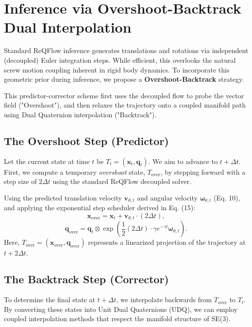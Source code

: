 \documentclass[a4paper,11pt]{article}
\begin{document}
\section{Inference via Overshoot-Backtrack Dual Interpolation}

Standard ReQFlow inference generates translations and rotations via independent (decoupled) Euler integration steps. While efficient, this overlooks the natural screw motion coupling inherent in rigid body dynamics. To incorporate this geometric prior during inference, we propose a \textbf{Overshoot-Backtrack} strategy.

This predictor-corrector scheme first uses the decoupled flow to probe the vector field ("Overshoot"), and then relaxes the trajectory onto a coupled manifold path using Dual Quaternion interpolation ("Backtrack").

\subsection{The Overshoot Step (Predictor)}
Let the current state at time $t$ be $T_t = (\bm{x}_t, \bm{q}_t)$. We aim to advance to $t + \Delta t$. First, we compute a temporary \textit{overshoot} state, $T_{\text{over}}$, by stepping forward with a step size of $2\Delta t$ using the standard ReQFlow decoupled solver.

Using the predicted translation velocity $\bm{v}_{\theta,t}$ and angular velocity $\bm{\omega}_{\theta,t}$ (Eq. 10), and applying the exponential step scheduler derived in Eq. (15):
\begin{equation}
    \bm{x}_{\text{over}} = \bm{x}_t + \bm{v}_{\theta,t} \cdot (2\Delta t),
\end{equation}
\begin{equation}
    \bm{q}_{\text{over}} = \bm{q}_t \otimes \exp\left( \frac{1}{2} (2\Delta t) \cdot \gamma e^{-\gamma t} \bm{\omega}_{\theta,t} \right).
\end{equation}
Here, $T_{\text{over}} = (\bm{x}_{\text{over}}, \bm{q}_{\text{over}})$ represents a linearized projection of the trajectory at $t + 2\Delta t$.

\subsection{The Backtrack Step (Corrector)}
To determine the final state at $t + \Delta t$, we interpolate backwards from $T_{\text{over}}$ to $T_t$. By converting these states into Unit Dual Quaternions (UDQ), we can employ coupled interpolation methods that respect the manifold structure of SE(3).
\end{document}
